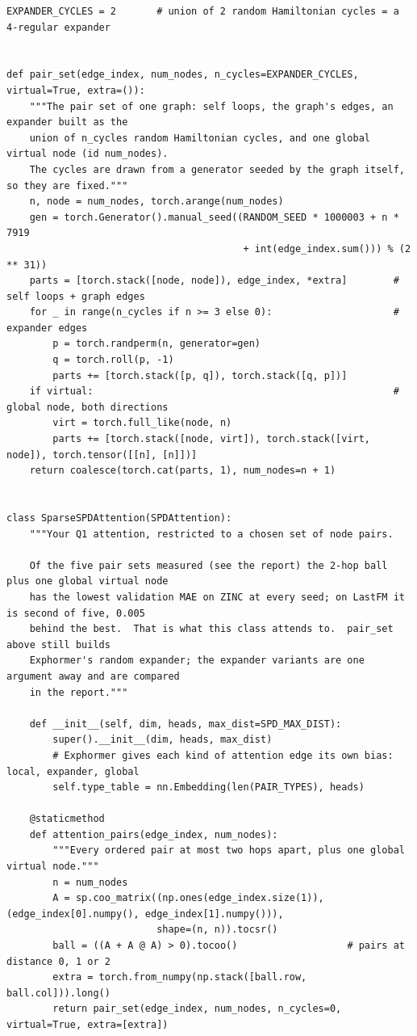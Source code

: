 \begin{lstlisting}[style=p1py]
EXPANDER_CYCLES = 2       # union of 2 random Hamiltonian cycles = a 4-regular expander


def pair_set(edge_index, num_nodes, n_cycles=EXPANDER_CYCLES, virtual=True, extra=()):
    """The pair set of one graph: self loops, the graph's edges, an expander built as the
    union of n_cycles random Hamiltonian cycles, and one global virtual node (id num_nodes).
    The cycles are drawn from a generator seeded by the graph itself, so they are fixed."""
    n, node = num_nodes, torch.arange(num_nodes)
    gen = torch.Generator().manual_seed((RANDOM_SEED * 1000003 + n * 7919
                                         + int(edge_index.sum())) % (2 ** 31))
    parts = [torch.stack([node, node]), edge_index, *extra]        # self loops + graph edges
    for _ in range(n_cycles if n >= 3 else 0):                     # expander edges
        p = torch.randperm(n, generator=gen)
        q = torch.roll(p, -1)
        parts += [torch.stack([p, q]), torch.stack([q, p])]
    if virtual:                                                    # global node, both directions
        virt = torch.full_like(node, n)
        parts += [torch.stack([node, virt]), torch.stack([virt, node]), torch.tensor([[n], [n]])]
    return coalesce(torch.cat(parts, 1), num_nodes=n + 1)


class SparseSPDAttention(SPDAttention):
    """Your Q1 attention, restricted to a chosen set of node pairs.

    Of the five pair sets measured (see the report) the 2-hop ball plus one global virtual node
    has the lowest validation MAE on ZINC at every seed; on LastFM it is second of five, 0.005
    behind the best.  That is what this class attends to.  pair_set above still builds
    Exphormer's random expander; the expander variants are one argument away and are compared
    in the report."""

    def __init__(self, dim, heads, max_dist=SPD_MAX_DIST):
        super().__init__(dim, heads, max_dist)
        # Exphormer gives each kind of attention edge its own bias: local, expander, global
        self.type_table = nn.Embedding(len(PAIR_TYPES), heads)

    @staticmethod
    def attention_pairs(edge_index, num_nodes):
        """Every ordered pair at most two hops apart, plus one global virtual node."""
        n = num_nodes
        A = sp.coo_matrix((np.ones(edge_index.size(1)), (edge_index[0].numpy(), edge_index[1].numpy())),
                          shape=(n, n)).tocsr()
        ball = ((A + A @ A) > 0).tocoo()                   # pairs at distance 0, 1 or 2
        extra = torch.from_numpy(np.stack([ball.row, ball.col])).long()
        return pair_set(edge_index, num_nodes, n_cycles=0, virtual=True, extra=[extra])


\end{lstlisting}
